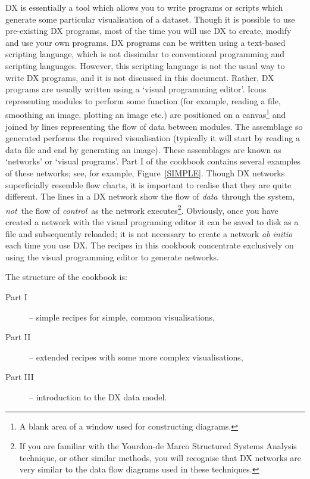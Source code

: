 \documentclass[twoside,11pt]{starlink}
\begin{document}
DX is essentially a tool which allows you to write programs or scripts
which generate some particular visualisation of a dataset. Though it is
possible to use pre-existing DX programs, most of the time you will use
DX to create, modify and use your own programs. DX programs can be
written using a text-based scripting language, which is not dissimilar
to conventional programming and scripting languages. However, this
scripting language is not the usual way to write DX programs, and it is
not discussed in this document. Rather, DX programs are usually written
using a `visual programming editor'. Icons representing modules to perform
some function (for example, reading a file, smoothing an image, plotting an
image etc.) are positioned on a canvas\footnote{A blank area of a window
used for constructing diagrams.} and joined by lines representing the
flow of data between modules. The assemblage so generated performs the
required visualisation (typically it will start by reading a data file
and end by generating an image). These assemblages are known as
`networks' or `visual programs'. Part I of the cookbook contains
several examples of these networks; see, for example,
Figure~\ref{SIMPLE}. Though DX networks superficially resemble flow
charts, it is important to realise that they are quite different. The
lines in a DX network show the flow of \textit{data}\, through the system,
\textit{not}\, the flow of \textit{control}\, as the network
executes\footnote{If you are familiar with the Yourdon-de Marco
Structured Systems Analysis technique, or other similar methods, you
will recognise that DX networks are very similar to the data flow
diagrams used in these techniques.}. Obviously, once you have created a
network with the visual programing editor it can be saved to disk as a
file and subsequently reloaded; it is not necessary to create a network
\textit{ab initio}\, each time you use DX. The recipes in this cookbook
concentrate exclusively on using the visual programming editor to generate
networks.

The structure of the cookbook is:

\begin{description}

  \item[{\rm Part I}] -- simple recipes for simple, common visualisations,

  \item[{\rm Part II}] -- extended recipes with some more complex
   visualisations,

  \item[{\rm Part III}] -- introduction to the DX data model.

\end{description}
\end{document}
